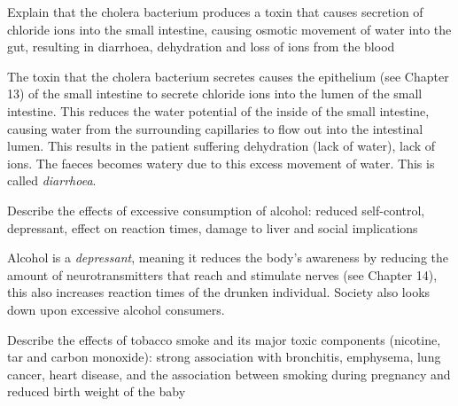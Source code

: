 \begin{point}
Explain that the cholera bacterium produces a toxin that causes secretion of chloride ions into the small 
intestine, causing osmotic movement of water into the gut, resulting in diarrhoea, dehydration and loss of 
ions from the blood
\end{point}

The toxin that the cholera bacterium secretes causes the epithelium (see Chapter 13) of the small
intestine
to secrete chloride ions into the lumen of the small intestine. This reduces the water potential
of the inside of the small intestine, causing water from the surrounding capillaries to flow out
into the intestinal lumen. This results in the patient suffering dehydration (lack of water), lack
of ions. The faeces becomes watery due to this excess movement of water. This is called
\emph{diarrhoea}.

\begin{point}
Describe the effects of excessive consumption of alcohol: reduced self-control, depressant, effect on 
reaction times, damage to liver and social implications
\end{point}

Alcohol is a \emph{depressant}, meaning it reduces the body's awareness by reducing the amount of
neurotransmitters that reach and stimulate nerves (see Chapter 14), this also increases reaction
times of the drunken individual. Society also looks down upon excessive alcohol consumers.

\begin{point}
Describe the effects of tobacco smoke and its major toxic components (nicotine, tar and carbon 
monoxide): strong association with bronchitis, emphysema, lung cancer, heart disease, and the 
association between smoking during pregnancy and reduced birth weight of the baby
\end{point}

